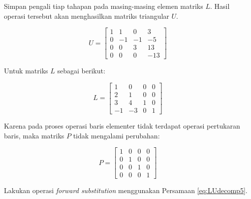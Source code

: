 \documentclass[]{book}
\theoremstyle{definition}
\theoremstyle{definition}
\theoremstyle{definition}
\theoremstyle{remark}
\begin{document}
Simpan pengali tiap tahapan pada masing-masing elemen matriks \(L\). Hasil operasi tersebut akan menghasilkan matriks triangular \(U\).

\[
U=
\begin{bmatrix}
     1       & 1       & 0       & 3           \\[0.3em]
     0       & -1      & -1      & -5          \\[0.3em]
     0       & 0       & 3       & 13          \\[0.3em]
     0       & 0       & 0       & -13           
\end{bmatrix}
\]

Untuk matriks \(L\) sebagai berikut:

\[
L=
\begin{bmatrix}
     1         & 0       & 0       & 0           \\[0.3em]
     2         & 1       & 0       & 0           \\[0.3em]
     3         & 4       & 1       & 0           \\[0.3em]
     -1        & -3      & 0       & 1           
\end{bmatrix}
\]

Karena pada proses operasi baris elementer tidak terdapat operasi pertukaran baris, maka matriks \(P\) tidak mengalami perubahan:

\[
P=
\begin{bmatrix}
     1         & 0       & 0       & 0           \\[0.3em]
     0         & 1       & 0       & 0           \\[0.3em]
     0         & 0       & 1       & 0           \\[0.3em]
     0         & 0       & 0       & 1           
     \end{bmatrix}
\]

Lakukan operasi \emph{forward substitution} menggunakan Persamaan \eqref{eq:LUdecomp5}.
\end{document}
